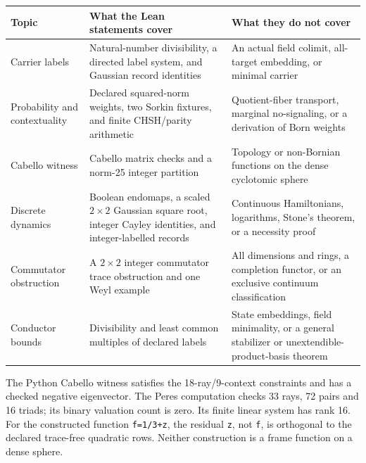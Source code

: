 \documentclass[
  11pt,
]{article}
\begin{document}
\begin{longtable}[]{@{}
  >{\raggedright\arraybackslash}p{}
  >{\raggedright\arraybackslash}p{}
  >{\raggedright\arraybackslash}p{}@{}}
\toprule\noalign{}
\begin{minipage}[b]{\linewidth}\raggedright
Topic
\end{minipage} & \begin{minipage}[b]{\linewidth}\raggedright
What the Lean statements cover
\end{minipage} & \begin{minipage}[b]{\linewidth}\raggedright
What they do not cover
\end{minipage} \\
\midrule\noalign{}
\endhead
\bottomrule\noalign{}
\endlastfoot
Carrier labels & Natural-number divisibility, a directed label system,
and Gaussian record identities & An actual field colimit, all-target
embedding, or minimal carrier \\
Probability and contextuality & Declared squared-norm weights, two
Sorkin fixtures, and finite CHSH\allowbreak{}/\allowbreak{}parity
arithmetic & Quotient-fiber transport, marginal no-signaling, or a
derivation of Born weights \\
Cabello witness & Cabello matrix checks and a norm-25 integer partition
& Topology or non-Bornian functions on the dense cyclotomic sphere \\
Discrete dynamics & Boolean endomaps, a scaled \(2\times2\) Gaussian
square root, integer Cayley identities, and integer-labelled records &
Continuous Hamiltonians, logarithms, Stone's theorem, or a necessity
proof \\
Commutator obstruction & A \(2\times2\) integer commutator trace
obstruction and one Weyl example & All dimensions and rings, a
completion functor, or an exclusive continuum classification \\
Conductor bounds & Divisibility and least common multiples of declared
labels & State embeddings, field minimality, or a general stabilizer or
unextendible-product-basis theorem \\
\end{longtable}

The Python Cabello witness satisfies the
18-ray\allowbreak{}/\allowbreak{}9-context constraints and has a checked
negative eigenvector. The Peres computation checks 33 rays, 72 pairs and
16 triads; its binary valuation count is zero. Its finite linear system
has rank 16. For the constructed function
\texttt{f\allowbreak{}=\allowbreak{}1\allowbreak{}/\allowbreak{}3\allowbreak{}+\allowbreak{}z},
the residual \texttt{z}, not \texttt{f}, is orthogonal to the declared
trace-free quadratic rows. Neither construction is a frame function on a
dense sphere.
\end{document}
